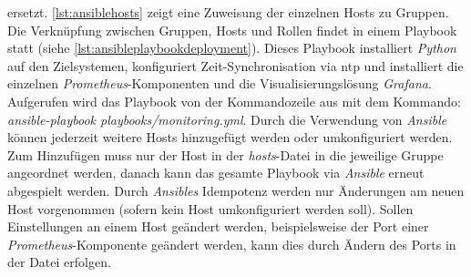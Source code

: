 \documentclass[titlepage]{report}
\begin{document}
ersetzt. \autoref{lst:ansiblehosts} zeigt eine Zuweisung der einzelnen
Hosts zu Gruppen. Die Verknüpfung zwischen Gruppen, Hosts und Rollen
findet in einem Playbook statt (siehe
\autoref{lst:ansibleplaybookdeployment}). Dieses Playbook installiert
\emph{Python} auf den Zielsystemen, konfiguriert
Zeit\hyp{}Synchronisation via \gls{ntp} und installiert die einzelnen
\emph{Prometheus}\hyp{}Komponenten und die Visualisierungslösung
\emph{Grafana}. Aufgerufen wird das Playbook von der Kommandozeile aus
mit dem Kommando: \emph{ansible-playbook playbooks/monitoring.yml}.
Durch die Verwendung von \emph{Ansible} können jederzeit weitere Hosts
hinzugefügt werden oder umkonfiguriert werden. Zum Hinzufügen muss nur
der Host in der \emph{hosts}\hyp{}Datei in die jeweilige Gruppe
angeordnet werden, danach kann das gesamte Playbook via \emph{Ansible}
erneut abgespielt werden. Durch \emph{Ansibles} Idempotenz werden nur
Änderungen am neuen Host vorgenommen (sofern kein Host umkonfiguriert
werden soll). Sollen Einstellungen an einem Host geändert werden,
beispielsweise der Port einer \emph{Prometheus}\hyp{}Komponente geändert
werden, kann dies durch Ändern des Ports in der Datei 
erfolgen.
\end{document}
